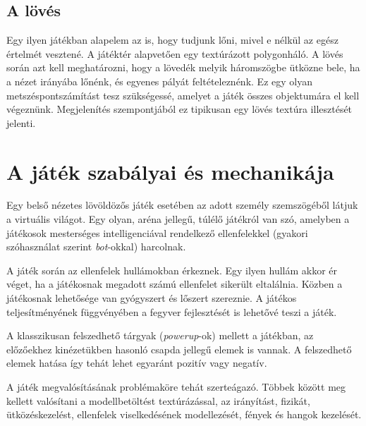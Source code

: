 \subsection{A lövés}

Egy ilyen játékban alapelem az is, hogy tudjunk lőni, mivel e nélkül az egész értelmét vesztené. A játéktér alapvetően egy textúrázott polygonháló. A lövés során azt kell meghatározni, hogy a lövedék melyik háromszögbe ütközne bele, ha a nézet irányába lőnénk, és egyenes pályát feltételeznénk. Ez egy olyan metszéspontszámítást tesz szükségessé, amelyet a játék összes objektumára el kell végeznünk. Megjelenítés szempontjából ez tipikusan egy lövés textúra illesztését jelenti.

\section{A játék szabályai és mechanikája}

Egy belső nézetes lövöldözős játék esetében az adott személy szemszögéből látjuk a virtuális világot. Egy olyan, aréna jellegű, túlélő játékról van szó, amelyben a játékosok mesterséges intelligenciával rendelkező ellenfelekkel (gyakori szóhasználat szerint \textit{bot}-okkal) harcolnak.

A játék során az ellenfelek hullámokban érkeznek. Egy ilyen hullám akkor ér véget, ha a játékosnak megadott számú ellenfelet sikerült eltalálnia. Közben a játékosnak lehetősége van gyógyszert és lőszert szereznie. A játékos teljesítményének függvényében a fegyver fejlesztését is lehetővé teszi a játék.

A klasszikusan felszedhető tárgyak (\textit{powerup}-ok) mellett a játékban, az előzőekhez kinézetükben hasonló csapda jellegű elemek is vannak. A felszedhető elemek hatása így tehát lehet egyaránt pozitív vagy negatív.

A játék megvalósításának problémaköre tehát szerteágazó. Többek között meg kellett valósítani a modellbetöltést textúrázással, az irányítást, fizikát, ütközéskezelést, ellenfelek viselkedésének modellezését, fények és hangok kezelését.

